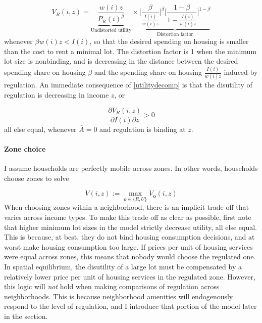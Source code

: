 \documentclass[11pt]{article}
\begin{document}
	\begin{equation}\label{utilitydecomp}
		V_{R}(i, z) = \underbrace{\frac{w(i)z}{P_{R}(i)^{\beta}}}_{\text{Undistorted utility}}  \times \underbrace{\bigg[\frac{\beta}{\frac{I(i)}{w(i)z}}\bigg]^{\beta}\bigg[\frac{1 - \beta}{ 1- \frac{I(i)}{w(i)z}}\bigg]^{1 - \beta}}_{\text{Distortion factor}}
	\end{equation}
	whenever $\beta w(i)z < I(i)$, so that the desired spending on housing is smaller than the cost to rent a minimal lot. The distortion factor is 1 when the minimum lot size is nonbinding, and is decreasing in the distance between the desired spending share on housing $\beta$ and the spending share on housing $\frac{I(i)}{w(i)z}$ induced by regulation. An immediate consequence of \eqref{utilitydecomp} is that the disutility of regulation is decreasing in income $z$, or 
	
	\begin{equation}\label{supermodularity}
	\frac{\partial V_{R}(i, z)}{\partial I(i) \partial z} > 0 	
	\end{equation} 
	 all else equal, whenever $\bar{A} = 0$ and regulation is binding at $z$. 

	\paragraph*{Zone choice}
	I assume households are perfectly mobile across zones. In other words, households choose zones to solve 
	
	\begin{equation}\label{zonechoice}
		V(i, z) := \max_{\boldsymbol{o} \in \{R, U\}}V_{\boldsymbol{o}}(i, z)
	\end{equation}
	When choosing zones within a neighborhood, there is an implicit trade off that varies across income types. To make this trade off as clear as possible, first note that higher minimum lot sizes in the model strictly decrease utility, all else equal. This is because, at best, they do not bind housing consumption decisions, and at worst make housing consumption too large. If prices per unit of housing services were equal across zones, this means that nobody would choose the regulated one. In spatial equilibrium, the disutility of a large lot must be compensated by a relatively lower price per unit of housing services in the regulated zone. However, this logic will \textit{not} hold when making comparisons of regulation across neighborhoods. This is because neighborhood amenities will endogenously respond to the level of regulation, and I introduce that portion of the model later in the section. 
\end{document}
